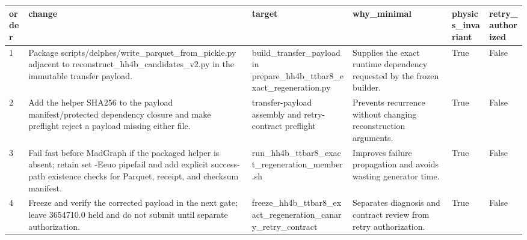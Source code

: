 \begin{tabular}{llllll}
\toprule
order & change & target & why\_minimal & physics\_invariant & retry\_authorized \\
\midrule
1 & Package scripts/delphes/write\_parquet\_from\_pickle.py adjacent to reconstruct\_hh4b\_candidates\_v2.py in the immutable transfer payload. & build\_transfer\_payload in prepare\_hh4b\_ttbar8\_exact\_regeneration.py & Supplies the exact runtime dependency requested by the frozen builder. & True & False \\
2 & Add the helper SHA256 to the payload manifest/protected dependency closure and make preflight reject a payload missing either file. & transfer-payload assembly and retry-contract preflight & Prevents recurrence without changing reconstruction arguments. & True & False \\
3 & Fail fast before MadGraph if the packaged helper is absent; retain set -Eeuo pipefail and add explicit success-path existence checks for Parquet, receipt, and checksum manifest. & run\_hh4b\_ttbar8\_exact\_regeneration\_member.sh & Improves failure propagation and avoids wasting generator time. & True & False \\
4 & Freeze and verify the corrected payload in the next gate; leave 3654710.0 held and do not submit until separate authorization. & freeze\_hh4b\_ttbar8\_exact\_regeneration\_canary\_retry\_contract & Separates diagnosis and contract review from retry authorization. & True & False \\
\bottomrule
\end{tabular}
